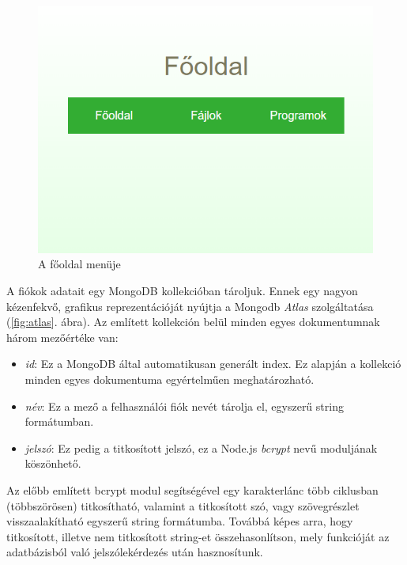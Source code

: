 \begin{figure}[h]
	\centering
		\includegraphics[width=10truecm, height=7truecm]{images/fooldal.png}
	\caption{A főoldal menüje}
	\label{fig:homeMenu}
\end{figure}

A fiókok adatait egy MongoDB kollekcióban tároljuk. Ennek egy nagyon kézenfekvő, grafikus reprezentációját nyújtja a Mongodb \textit{Atlas} szolgáltatása (\ref{fig:atlas}. ábra). Az említett kollekción belül minden egyes dokumentumnak három mezőértéke van:

\begin{itemize}
\item{\textit{id}}: Ez a MongoDB által automatikusan generált index. Ez alapján a kollekció minden egyes dokumentuma egyértelműen meghatározható.
\item{\textit{név}}: Ez a mező a felhasználói fiók nevét tárolja el, egyszerű string formátumban.
\item{\textit{jelszó}}: Ez pedig a titkosított jelszó, ez a Node.js \textit{bcrypt} nevű moduljának köszönhető.
\end{itemize}

Az előbb említett bcrypt modul segítségével egy karakterlánc több ciklusban (többszörösen) titkosítható, valamint a titkosított szó, vagy szövegrészlet visszaalakítható egyszerű string formátumba. Továbbá képes arra, hogy titkosított, illetve nem titkosított string-et összehasonlítson, mely funkcióját az adatbázisból való jelszólekérdezés után hasznosítunk.


